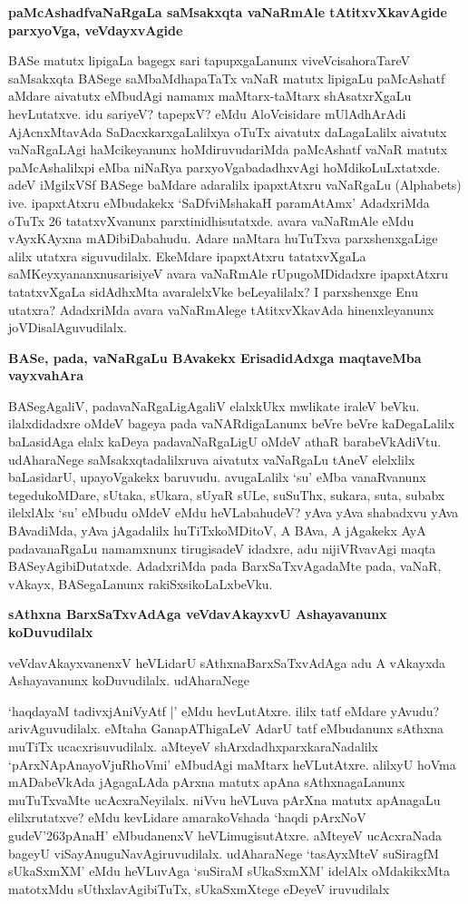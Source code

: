 {\bf paMcAshadfvaNaRgaLa saMsakxqta vaNaRmAle tAtitxvXkavAgide parxyoVga, veVdayxvAgide}

BASe matutx lipigaLa bagegx sari tapupxgaLanunx viveVcisahoraTareV saMsakxqta BASege saMbaMdhapaTaTx vaNaR matutx lipigaLu paMcAshatf aMdare aivatutx eMbudAgi namamx maMtarx-taMtarx shAsatxrXgaLu hevLutatxve. idu sariyeV? tapepxV? eMdu AloVcisidare mUlAdhArAdi AjAcnxMtavAda SaDacxkarxgaLalilxya oTuTx aivatutx daLagaLalilx aivatutx vaNaRgaLAgi haMcikeyanunx hoMdiruvudariMda paMcAshatf vaNaR matutx paMcAshalilxpi eMba niNaRya parxyoVgabadadhxvAgi hoMdikoLuLxtatxde. adeV iMgilxVSf BASege baMdare adaralilx ipapxtAtxru vaNaRgaLu {\rm (Alphabets)} ive. ipapxtAtxru eMbudakekx `SaDfviMshakaH paramAtAmx' AdadxriMda oTuTx 26 tatatxvXvanunx parxtinidhisutatxde. avara vaNaRmAle eMdu vAyxKAyxna mADibiDabahudu. Adare naMtara huTuTxva parxshenxgaLige alilx utatxra siguvudilalx. EkeMdare ipapxtAtxru tatatxvXgaLa saMKeyxyananxnusarisiyeV avara vaNaRmAle rUpugoMDidadxre ipapxtAtxru tatatxvXgaLa sidAdhxMta avaralelxVke beLeyalilalx? I parxshenxge Enu utatxra? AdadxriMda avara vaNaRmAlege tAtitxvXkavAda hinenxleyanunx joVDisalAguvudilalx.

{\bf BASe, pada, vaNaRgaLu BAvakekx ErisadidAdxga maqtaveMba vayxvahAra}

BASegAgaliV, padavaNaRgaLigAgaliV elalxkUkx mwlikate iraleV beVku. ilalxdidadxre oMdeV bageya pada vaNARdigaLanunx beVre beVre kaDegaLalilx baLasidAga elalx kaDeya padavaNaRgaLigU oMdeV athaR barabeVkAdiVtu. udAharaNege saMsakxqtadalilxruva aivatutx vaNaRgaLu tAneV elelxlilx baLasidarU, upayoVgakekx baruvudu. avugaLalilx `su' eMba vanaRvanunx tegedukoMDare, sUtaka, sUkara, sUyaR sULe, suSuThx, sukara, suta, subabx ilelxlAlx `su' eMbudu oMdeV eMdu heVLabahudeV? yAva yAva shabadxvu yAva BAvadiMda, yAva jAgadalilx huTiTxkoMDitoV, A BAva, A jAgakekx AyA padavanaRgaLu namamxnunx tirugisadeV idadxre, adu nijiVRvavAgi maqta BASeyAgibiDutatxde. AdadxriMda pada BarxSaTxvAgadaMte pada, vaNaR, vAkayx, BASegaLanunx rakiSxsikoLaLxbeVku.

{\bf sAthxna BarxSaTxvAdAga veVdavAkayxvU Ashayavanunx koDuvudilalx}

veVdavAkayxvanenxV heVLidarU sAthxnaBarxSaTxvAdAga adu A vAkayxda Ashayavanunx koDuvudilalx. udAharaNege

`haqdayaM tadivxjAniVyAtf |' eMdu hevLutAtxre. ililx tatf eMdare yAvudu? arivAguvudilalx. eMtaha GanapAThigaLeV AdarU tatf eMbudanunx sAthxna muTiTx ucacxrisuvudilalx. aMteyeV shArxdadhxparxkaraNadalilx `pArxNApAnayoVjuRhoVmi' eMbudAgi maMtarx heVLutAtxre. alilxyU hoVma mADabeVkAda jAgagaLAda pArxna matutx apAna sAthxnagaLanunx muTuTxvaMte ucAcxraNeyilalx. niVvu heVLuva pArXna matutx apAnagaLu elilxrutatxve? eMdu kevLidare amarakoVshada `haqdi pArxNoV gudeV\char'263pAnaH' eMbudanenxV heVLimugisutAtxre. aMteyeV ucAcxraNada bageyU viSayAnuguNavAgiruvudilalx. udAharaNege `tasAyxMteV suSiragfM sUkaSxmXM' eMdu heVLuvAga `suSiraM sUkaSxmXM' idelAlx oMdakikxMta matotxMdu sUthxlavAgibiTuTx, sUkaSxmXtege eDeyeV iruvudilalx

